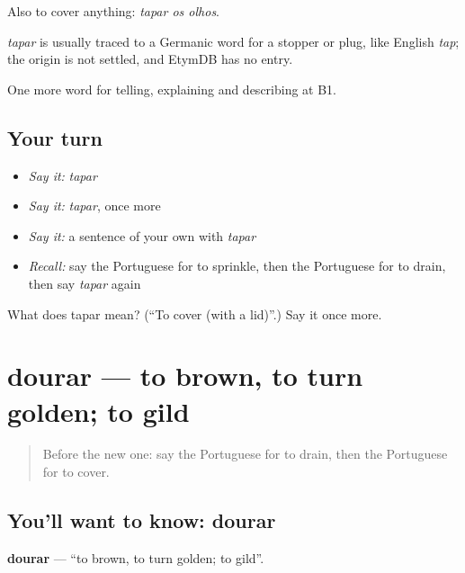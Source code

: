 Also to cover anything: \emph{tapar os olhos}.

\begin{cousinweb}
\emph{tapar} is usually traced to a Germanic word for a stopper or plug, like English \emph{tap}; the origin is not settled, and EtymDB has no entry.
\end{cousinweb}

\begin{grammarlens}[title={What you've built}]
One more word for telling, explaining and describing at B1.
\end{grammarlens}

\subsection*{Your turn}
\begin{itemize}
\raggedright
  \item \emph{Say it:} \emph{tapar}
  \item \emph{Say it:} \emph{tapar}, once more
  \item \emph{Say it:} a sentence of your own with \emph{tapar}
  \item \emph{Recall:} say the Portuguese for to sprinkle, then the Portuguese for to drain, then say \emph{tapar} again
\end{itemize}

\begin{tcolorbox}[breakable,colback=teal!4,colframe=teal!35!black,title={Before you move on}]
What does tapar mean? (\textquotedblleft{}To cover (with a lid)\textquotedblright{}.) Say it once more.
\end{tcolorbox}
\section[dourar]{dourar — to brown, to turn golden; to gild}

\label{lesson:PT-C334-dourar}



\begin{quote}
Before the new one: say the Portuguese for to drain, then the Portuguese for to cover.
\end{quote}

\subsection*{You'll want to know: dourar}
\textbf{dourar} — \textquotedblleft{}to brown, to turn golden; to gild\textquotedblright{}.

